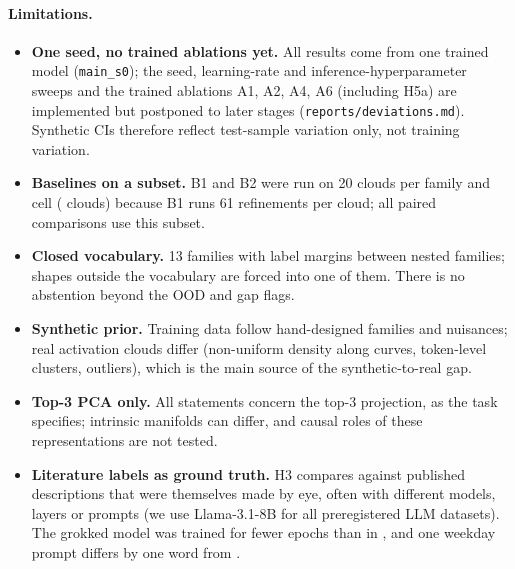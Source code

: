 \paragraph{Limitations.}
\label{sec:limitations}
\begin{itemize}
\item \textbf{One seed, no trained ablations yet.} All results come from one trained model (\texttt{main\_s0}); the seed, learning-rate and inference-hyperparameter sweeps and the trained ablations A1, A2, A4, A6 (including H5a) are implemented but postponed to later stages (\texttt{reports/deviations.md}). Synthetic CIs therefore reflect test-sample variation only, not training variation.
\item \textbf{Baselines on a subset.} B1 and B2 were run on 20 clouds per family and cell (\nBone{} clouds) because B1 runs 61 refinements per cloud; all paired comparisons use this subset.
\item \textbf{Closed vocabulary.} 13 families with label margins between nested families; shapes outside the vocabulary are forced into one of them. There is no abstention beyond the OOD and gap flags.
\item \textbf{Synthetic prior.} Training data follow hand-designed families and nuisances; real activation clouds differ (non-uniform density along curves, token-level clusters, outliers), which is the main source of the synthetic-to-real gap.
\item \textbf{Top-3 PCA only.} All statements concern the top-3 projection, as the task specifies; intrinsic manifolds can differ, and causal roles of these representations are not tested.
\item \textbf{Literature labels as ground truth.} H3 compares against published descriptions that were themselves made by eye, often with different models, layers or prompts (we use Llama-3.1-8B for all preregistered LLM datasets). The grokked model was trained for fewer epochs than in \citet{nanda2023progress}, and one weekday prompt differs by one word from \citet{engels2025notall}.
\end{itemize}
